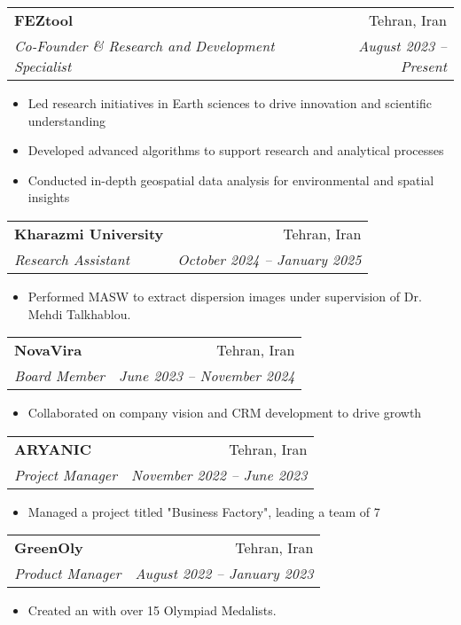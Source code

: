 \documentclass[letterpaper,11pt]{article}
\makeatletter
\newcommand{\resitem}[1]{\item #1 \vspace{-2pt}}
\newcommand{\ressubheading}[4]{%
	\begin{tabular*}{\textwidth}{l@{\cftdotfill{\cftsecdotsep}\extracolsep{\fill}}r}
		\textbf{#1} & #2 \\
		\textit{#3} & \textit{#4} \\
	\end{tabular*}\vspace{-8pt}
}
\makeatother
\begin{document}
	\vspace{-0.78em} 
	\ressubheading{FEZtool}{Tehran, Iran}{Co-Founder \& Research and Development Specialist}{August 2023 – Present}
	\begin{itemize}[topsep=7.5pt,partopsep=0pt,itemsep=3.5pt,parsep=0pt]
		\resitem{Led research initiatives in Earth sciences to drive innovation and scientific understanding}
		\resitem{Developed advanced algorithms to support research and analytical processes}
		\resitem{Conducted in-depth geospatial data analysis for environmental and spatial insights}
	\end{itemize}
	\vspace{-0.50em} 
	\ressubheading{Kharazmi University}{Tehran, Iran}{Research Assistant}{October 2024 – January 2025}
	\begin{itemize}[topsep=7.5pt,partopsep=0pt,itemsep=3.5pt,parsep=0pt]
		\resitem{Performed MASW to extract dispersion images under supervision of Dr. Mehdi Talkhablou.}
	\end{itemize}
	\vspace{-0.50em} 
	\ressubheading{NovaVira}{Tehran, Iran}{Board Member}{June 2023 – November 2024}
	\begin{itemize}[topsep=7.5pt,partopsep=0pt,itemsep=3.5pt,parsep=0pt]
		\resitem{Collaborated on company vision and CRM development to drive growth}
	\end{itemize}
	\vspace{-0.50em} 
	\ressubheading{ARYANIC}{Tehran, Iran}{Project Manager}{November 2022 – June 2023}
	\begin{itemize}[topsep=7.5pt,partopsep=0pt,itemsep=3.5pt,parsep=0pt]
		\resitem{Managed a project titled "Business Factory", leading a team of 7}
	\end{itemize}
	\vspace{-0.50em} 
	\ressubheading{GreenOly}{Tehran, Iran}{Product Manager}{August 2022 – January 2023}
	\begin{itemize}[topsep=7.5pt,partopsep=0pt,itemsep=3.5pt,parsep=0pt]
		\resitem{Created an
			\href{https://aradfarahani.com/MOOC/}{\dotuline{Entrepreneurship MOOC}} with over 15 Olympiad Medalists.}
		
	\end{itemize}


	
\end{document}
